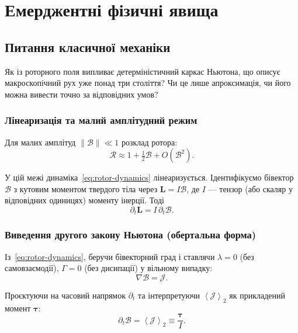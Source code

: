 \documentclass[11pt,a4paper]{article}
\newcommand{\grade}[2]{\left\langle #1 \right\rangle_{#2}}
\newcommand{\biv}[1]{\grade{#1}{2}}
\newcommand{\Rotor}{\mathcal{R}}
\newcommand{\Biv}{\mathcal{B}}
\newcommand{\D}{\nabla}                        %
\theoremstyle{definition}
\theoremstyle{plain}
\theoremstyle{remark}
\begin{document}
\vspace{1em}

\section{Емерджентні фізичні явища}\label{sec:emergent}

\subsection{Питання класичної механіки}

Як із роторного поля випливає детерміністичний каркас Ньютона, що описує макроскопічний рух уже понад три століття? Чи це лише апроксимація, чи його можна вивести точно за відповідних умов?

\subsubsection{Лінеаризація та малий амплітудний режим}

Для малих амплітуд $\|\Biv\| \ll 1$ розклад ротора:
\begin{equation}
\Rotor \approx 1 + \tfrac{1}{2}\Biv + O(\Biv^2).
\end{equation}

У цій межі динаміка~\eqref{eq:rotor-dynamics} лінеаризується. Ідентифікуємо бівектор $\Biv$ з кутовим моментом твердого тіла через $\bm{L} = I\Biv$, де $I$ — тензор (або скаляр у відповідних одиницях) моменту інерції. Тоді
\begin{equation}
\partial_t \bm{L} = I\, \partial_t \Biv.
\end{equation}

\subsubsection{Виведення другого закону Ньютона (обертальна форма)}

Із~\eqref{eq:rotor-dynamics}, беручи бівекторний град і ставлячи $\lambda=0$ (без самовзаємодії), $\Gamma=0$ (без дисипації) у вільному випадку:
\begin{equation}
\D \Biv = \mathcal{J}.
\end{equation}

Проєктуючи на часовий напрямок $\partial_t$ та інтерпретуючи $\biv{\mathcal{J}}$ як прикладений момент $\bm{\tau}$:
\begin{equation}
\partial_t \Biv = \biv{\mathcal{J}} \equiv \frac{\bm{\tau}}{I}.
\end{equation}
\end{document}

